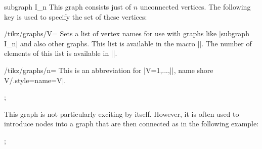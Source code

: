 \begin{graph}{subgraph I\_n}
    This graph consists just of $n$ unconnected vertices. The following key is
    used to specify the set of these vertices:
    \begin{key}{/tikz/graphs/V=}
        Sets a list of vertex names for use with graphs like |subgraph I_n| and
        also other graphs. This list is available in the macro |\tikzgraphV|.
        The number of elements of this list is available in |\tikzgraphVnum|.
    \end{key}
    \begin{key}{/tikz/graphs/n=}
        This is an abbreviation for
        |V={1,...,||}, name shore V/.style={name=V}|.
    \end{key}
\begin{codeexample}[preamble={\usetikzlibrary{graphs.standard}}]
\tikz {};
\end{codeexample}
    This graph is not particularly exciting by itself. However, it is often
    used to introduce nodes into a graph that are then connected as in the
    following example:
\begin{codeexample}[preamble={\usetikzlibrary{graphs.standard}}]
\tikz {};
\end{codeexample}
\end{graph}

